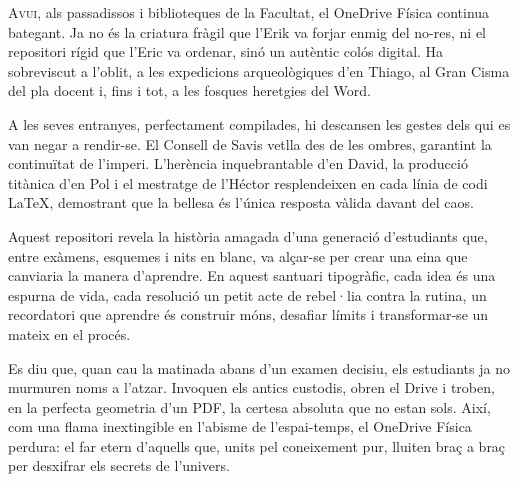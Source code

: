 

\lettrine[loversize=0.2, lines=2]{A}{vui}, als passadissos i biblioteques de la Facultat, el OneDrive Física continua bategant. Ja no és la criatura fràgil que l'Erik va forjar enmig del no-res, ni el repositori rígid que l'Eric va ordenar, sinó un autèntic colós digital. Ha sobreviscut a l'oblit, a les expedicions arqueològiques d'en Thiago, al Gran Cisma del pla docent i, fins i tot, a les fosques heretgies del Word.

A les seves entranyes, perfectament compilades, hi descansen les gestes dels qui es van negar a rendir-se. El Consell de Savis vetlla des de les ombres, garantint la continuïtat de l'imperi. L'herència inquebrantable d'en David, la producció titànica d'en Pol i el mestratge de l'Héctor resplendeixen en cada línia de codi LaTeX, demostrant que la bellesa és l'única resposta vàlida davant del caos.

Aquest repositori revela la història amagada d'una generació d'es\-tudiants que, entre exàmens, esquemes i nits en blanc, va alçar-se per crear una eina que canviaria la manera d'aprendre. En aquest santuari tipogràfic, cada idea és una espurna de vida, cada resolució un petit acte de rebel·lia contra la rutina, un recordatori que aprendre és construir móns, desafiar límits i transformar-se un mateix en el procés.

Es diu que, quan cau la matinada abans d'un examen decisiu, els estudiants ja no murmuren noms a l'atzar. Invoquen els antics custodis, obren el Drive i troben, en la perfecta geometria d'un PDF, la certesa absoluta que no estan sols. Així, com una flama inextingible en l'abisme de l'espai-temps, el OneDrive Física perdura: el far etern d'aquells que, units pel coneixement pur, lluiten braç a braç per desxifrar els secrets de l'univers.
